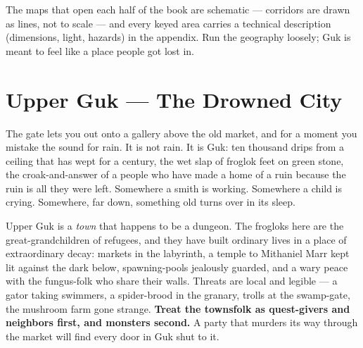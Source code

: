 \documentclass[10pt,twoside]{report}
\begin{document}
\begin{center}
\end{center}

\noindent The maps that open each half of the book are schematic --- corridors are drawn as lines, not to scale --- and every keyed area carries a technical description (dimensions, light, hazards) in the appendix. Run the geography loosely; Guk is meant to feel like a place people got lost in.

\clearpage

\chapter{Upper Guk --- The Drowned City}
\begin{readaloud}
The gate lets you out onto a gallery above the old market, and for a moment you mistake the sound for rain. It is not rain. It is Guk: ten thousand drips from a ceiling that has wept for a century, the wet slap of froglok feet on green stone, the croak-and-answer of a people who have made a home of a ruin because the ruin is all they were left. Somewhere a smith is working. Somewhere a child is crying. Somewhere, far down, something old turns over in its sleep.
\end{readaloud}

\noindent Upper Guk is a \emph{town} that happens to be a dungeon. The frogloks here are the great-grandchildren of refugees, and they have built ordinary lives in a place of extraordinary decay: markets in the labyrinth, a temple to Mithaniel Marr kept lit against the dark below, spawning-pools jealously guarded, and a wary peace with the fungus-folk who share their walls. Threats are local and legible --- a gator taking swimmers, a spider-brood in the granary, trolls at the swamp-gate, the mushroom farm gone strange. \textbf{Treat the townsfolk as quest-givers and neighbors first, and monsters second.} A party that murders its way through the market will find every door in Guk shut to it.
\end{document}
